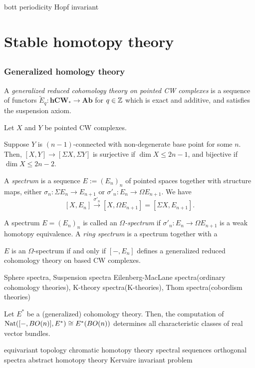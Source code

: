 \documentclass{../../large}
\begin{document}
bott periodicity
Hopf invariant











\part{Stable homotopy theory}


\chapter{}
\section{Generalized homology theory}

A \emph{generalized reduced cohomology theory on pointed CW complexes} is a sequence of functors $\tilde E_q:\mathbf{hCW}_*\to\mathbf{Ab}$ for $q\in\mathbb{Z}$ which is exact and additive, and satisfies the suspension axiom.

\begin{prb}
Let $X$ and $Y$ be pointed CW complexes.
\begin{parts}
\item Suppose $Y$ is $(n-1)$-connected with non-degenerate base point for some $n$. Then, $[X,Y]\to[\Sigma X,\Sigma Y]$ is surjective if $\dim X\le 2n-1$, and bijective if $\dim X\le2n-2$.
\end{parts}
\end{prb}


\begin{prb}
A \emph{spectrum} is a sequence $E:=(E_n)_n$ of pointed spaces together with structure maps, either $\sigma_n:\Sigma E_n\to E_{n+1}$ or $\sigma'_n:E_n\to\Omega E_{n+1}$.
We have
\[[X,E_n]\xrightarrow{\sigma'_n}[X,\Omega E_{n+1}]=[\Sigma X,E_{n+1}].\]
\end{prb}

\begin{prb}
A spectrum $E=(E_n)_n$ is called an \emph{$\Omega$-spectrum} if $\sigma'_n:E_n\to\Omega E_{n+1}$ is a weak homotopy equivalence.
A \emph{ring spectrum} is a spectrum together with a 
\begin{parts}
\item $E$ is an $\Omega$-spectrum if and only if $[-,E_n]$ defines a generalized reduced cohomology theory on based CW complexes.
\end{parts}
\end{prb}


Sphere spectra, Suspension spectra
Eilenberg-MacLane spectra(ordinary cohomology theories), K-theory spectra(K-theories), Thom spectra(cobordism theories)



Let $E^*$ be a (generalized) cohomology theory.
Then, the computation of $\operatorname{Nat}([-,BO(n)],E^*)\cong E^*(BO(n))$ determines all characteristic classes of real vector bundles.




equivariant topology
chromatic homotopy theory
spectral sequences
orthogonal spectra
abstract homotopy theory
Kervaire invariant problem
\end{document}

